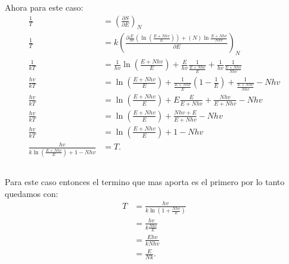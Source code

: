 \documentclass{report}
\begin{document}
Ahora para este caso:
\begin{align*}
  \frac{1}{T} &= \left( \frac{\partial S}{\partial E}  \right)_{N} \\
  \frac{1}{T} &= k\left( \frac{\partial \frac{E}{hv}\left( \ln\left(\frac{E + Nhv}{E} \right)  \right) + \left( N \right) \ln\frac{E + Nhv}{Nhv}}{\partial E}  \right)_{N} \\
  \frac{1}{kT} &= \frac{1}{hv}\ln\left( \frac{E + Nhv}{E} \right) + \frac{E}{hv}\frac{1}{\frac{E + Nhv}{E}}  + \frac{1}{hv}\frac{1}{\frac{E + Nhv}{Nhv}}\\
  \frac{hv}{kT} &= \ln\left( \frac{E + Nhv}{E} \right) + \frac{1}{\frac{E + Nhv}{E}}\left( 1 - \frac{1}{E} \right)   + \frac{1}{\frac{E + Nhv}{Nhv}} - Nhv\\
  \frac{hv}{kT} &= \ln\left( \frac{E + Nhv}{E} \right) + E\frac{E}{E + Nhv}  + \frac{Nhv}{E + Nhv} - Nhv\\
  \frac{hv}{kT} &= \ln\left( \frac{E + Nhv}{E} \right) + \frac{Nhv + E}{E + Nhv} - Nhv\\
  \frac{hv}{kT} &= \ln\left( \frac{E + Nhv}{E} \right) + 1 - Nhv\\
  \frac{hv}{k\ln\left( \frac{E + Nhv}{E} \right) + 1 - Nhv} &=T
.\end{align*}
\section{}

Para este caso entonces el termino que mas aporta es el primero por lo tanto quedamos con:
\begin{align*}
  T &= \frac{hv}{k \ln\left( 1 + \frac{Nhv}{E} \right) } \\
  &= \frac{hv}{k \frac{Nhv}{E}} \\
  &= \frac{Ehv}{k Nhv} \\
  &= \frac{E}{Nk}
.\end{align*}

\chapter{}
\end{document}
